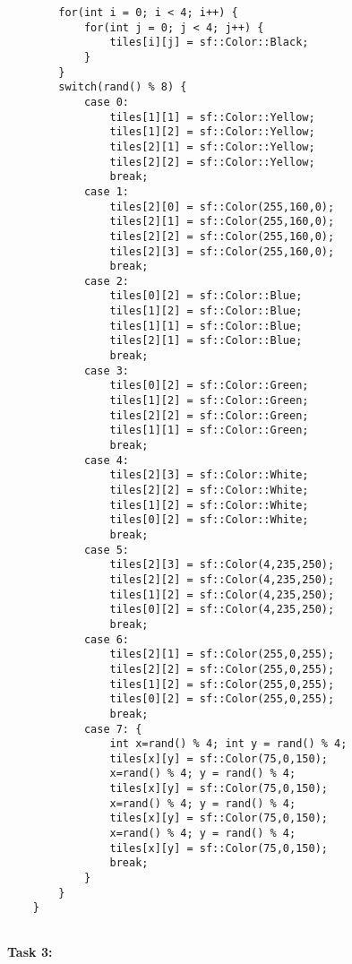 \documentclass[11pt]{amsart}
\begin{document}
\begin{verbatim}
	    for(int i = 0; i < 4; i++) {
	        for(int j = 0; j < 4; j++) {
	            tiles[i][j] = sf::Color::Black;
	        }
	    }
	    switch(rand() % 8) {
	        case 0:
	            tiles[1][1] = sf::Color::Yellow;
	            tiles[1][2] = sf::Color::Yellow;
	            tiles[2][1] = sf::Color::Yellow;
	            tiles[2][2] = sf::Color::Yellow;
	            break;
	        case 1:
	            tiles[2][0] = sf::Color(255,160,0);
	            tiles[2][1] = sf::Color(255,160,0);
	            tiles[2][2] = sf::Color(255,160,0);
	            tiles[2][3] = sf::Color(255,160,0);
	            break;
	        case 2:
	            tiles[0][2] = sf::Color::Blue;
	            tiles[1][2] = sf::Color::Blue;
	            tiles[1][1] = sf::Color::Blue;
	            tiles[2][1] = sf::Color::Blue;
	            break;
	        case 3:
	            tiles[0][2] = sf::Color::Green;
	            tiles[1][2] = sf::Color::Green;
	            tiles[2][2] = sf::Color::Green;
	            tiles[1][1] = sf::Color::Green;
	            break;
	        case 4:
	            tiles[2][3] = sf::Color::White;
	            tiles[2][2] = sf::Color::White;
	            tiles[1][2] = sf::Color::White;
	            tiles[0][2] = sf::Color::White;
	            break;
	        case 5:
	            tiles[2][3] = sf::Color(4,235,250);
	            tiles[2][2] = sf::Color(4,235,250);
	            tiles[1][2] = sf::Color(4,235,250);
	            tiles[0][2] = sf::Color(4,235,250);
	            break;
	        case 6:
	            tiles[2][1] = sf::Color(255,0,255);
	            tiles[2][2] = sf::Color(255,0,255);
	            tiles[1][2] = sf::Color(255,0,255);
	            tiles[0][2] = sf::Color(255,0,255);
	            break;
	        case 7: {
	            int x=rand() % 4; int y = rand() % 4;
	            tiles[x][y] = sf::Color(75,0,150);
	            x=rand() % 4; y = rand() % 4;
	            tiles[x][y] = sf::Color(75,0,150);
	            x=rand() % 4; y = rand() % 4;
	            tiles[x][y] = sf::Color(75,0,150);
	            x=rand() % 4; y = rand() % 4;
	            tiles[x][y] = sf::Color(75,0,150);
	            break;
	        }
	    }
	}


\end{verbatim}


\textbf{Task 3:} \\
\end{document}
